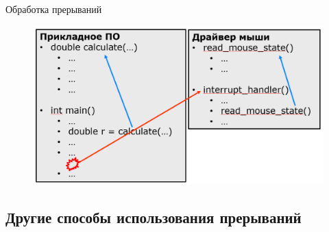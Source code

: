 \documentclass[xetex,aspectratio=43]{beamer}
\begin{document}
\begin{frame}{Обработка прерываний}
	\begin{figure}
		\includegraphics[height=0.7\textheight]{img/03.interrupt_invokation.png}
	\end{figure}
\end{frame}

\subsection{Другие способы использования прерываний}
\end{document}
